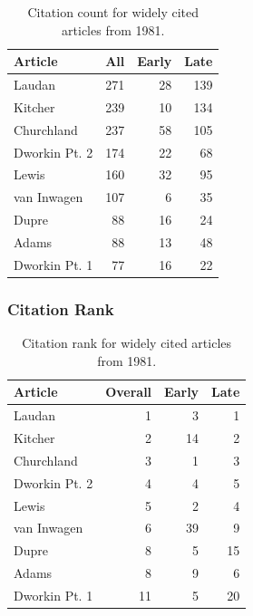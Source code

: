 \documentclass[
  10pt,
  letterpaper,
  DIV=11,
  numbers=noendperiod,
  twoside]{scrartcl}
\begin{document}
\begin{longtable}[]{@{}lrrr@{}}

\caption{\label{tbl-citation-count-1981}Citation count for widely cited
articles from 1981.}

\tabularnewline

\toprule\noalign{}
Article & All & Early & Late \\
\midrule\noalign{}
\endhead
\bottomrule\noalign{}
\endlastfoot
Laudan & 271 & 28 & 139 \\
Kitcher & 239 & 10 & 134 \\
Churchland & 237 & 58 & 105 \\
Dworkin Pt. 2 & 174 & 22 & 68 \\
Lewis & 160 & 32 & 95 \\
van Inwagen & 107 & 6 & 35 \\
Dupre & 88 & 16 & 24 \\
Adams & 88 & 13 & 48 \\
Dworkin Pt. 1 & 77 & 16 & 22 \\

\end{longtable}

\subsubsection*{Citation Rank}\label{sec-rank-1981}

\begin{longtable}[]{@{}lrrr@{}}

\caption{\label{tbl-citation-rank-1981}Citation rank for widely cited
articles from 1981.}

\tabularnewline

\toprule\noalign{}
Article & Overall & Early & Late \\
\midrule\noalign{}
\endhead
\bottomrule\noalign{}
\endlastfoot
Laudan & 1 & 3 & 1 \\
Kitcher & 2 & 14 & 2 \\
Churchland & 3 & 1 & 3 \\
Dworkin Pt. 2 & 4 & 4 & 5 \\
Lewis & 5 & 2 & 4 \\
van Inwagen & 6 & 39 & 9 \\
Dupre & 8 & 5 & 15 \\
Adams & 8 & 9 & 6 \\
Dworkin Pt. 1 & 11 & 5 & 20 \\

\end{longtable}
\end{document}
